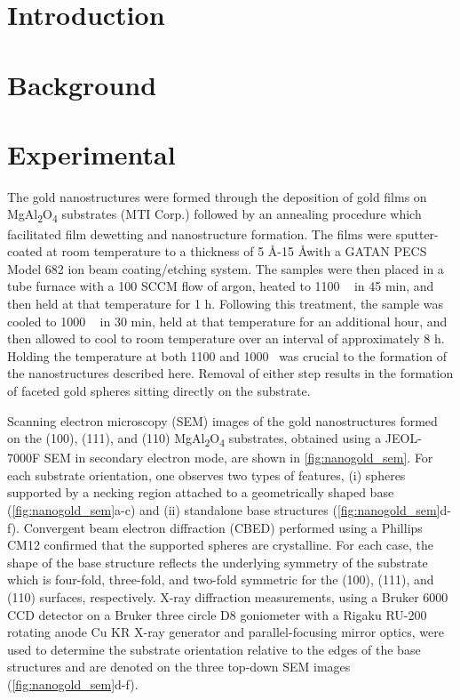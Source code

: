 \section{Introduction}

\section{Background}

\section{Experimental}
The gold nanostructures were formed through the deposition of gold films on MgAl\textsubscript{2}O\textsubscript{4} substrates (MTI Corp.)
followed by an annealing procedure which facilitated film
dewetting and nanostructure formation. The films were
sputter-coated at room temperature to a thickness of 5 \AA-15
\AA with a GATAN PECS Model 682 ion beam coating/etching system. The samples were then placed in a tube
furnace with a 100 SCCM flow of argon, heated to 1100 \celsius~
in 45 min, and then held at that temperature for 1 h.
Following this treatment, the sample was cooled to 1000 \celsius~
in 30 min, held at that temperature for an additional hour,
and then allowed to cool to room temperature over an interval
of approximately 8 h. Holding the temperature at both 1100
and 1000 \celsius~was crucial to the formation of the nanostructures described here. Removal of either step results in the formation of faceted gold spheres sitting directly on the substrate.

Scanning electron microscopy (SEM) images of the gold
nanostructures formed on the (100), (111), and (110)
MgAl\textsubscript{2}O\textsubscript{4} substrates, obtained using a JEOL-7000F SEM in
secondary electron mode, are shown in \cref{fig:nanogold_sem}. For each
substrate orientation, one observes two types of features, (i)
spheres supported by a necking region attached to a geometrically shaped base (\cref{fig:nanogold_sem}a-c) and (ii) standalone base
structures (\cref{fig:nanogold_sem}d-f). Convergent beam electron diffraction (CBED) performed using a Phillips CM12 confirmed
that the supported spheres are crystalline. For each case, the shape of the base structure reflects the underlying symmetry
of the substrate which is four-fold, three-fold, and two-fold
symmetric for the (100), (111), and (110) surfaces, respectively. X-ray diffraction measurements, using a Bruker 6000
CCD detector on a Bruker three circle D8 goniometer with
a Rigaku RU-200 rotating anode Cu KR X-ray generator and
parallel-focusing mirror optics, were used to determine the
substrate orientation relative to the edges of the base
structures and are denoted on the three top-down SEM
images (\cref{fig:nanogold_sem}d-f).
